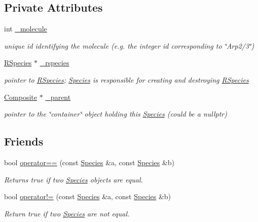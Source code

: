 \subsection*{Private Attributes}
\begin{DoxyCompactItemize}
\item 
int \hyperlink{classchem_1_1Species_afc69264ab4c24ac17b7d1946b1b380f4}{\-\_\-molecule}
\begin{DoxyCompactList}\small\item\em unique id identifying the molecule (e.\-g. the integer id corresponding to \char`\"{}\-Arp2/3\char`\"{}) \end{DoxyCompactList}\item 
\hyperlink{classchem_1_1RSpecies}{R\-Species} $\ast$ \hyperlink{classchem_1_1Species_aa6a2ec40f6f1b08c76a184d11571c570}{\-\_\-rspecies}
\begin{DoxyCompactList}\small\item\em pointer to \hyperlink{classchem_1_1RSpecies}{R\-Species}; \hyperlink{classchem_1_1Species}{Species} is responsible for creating and destroying \hyperlink{classchem_1_1RSpecies}{R\-Species} \end{DoxyCompactList}\item 
\hyperlink{classchem_1_1Composite}{Composite} $\ast$ \hyperlink{classchem_1_1Species_ae0743ec422b63dcb29b4cbfee484902d}{\-\_\-parent}
\begin{DoxyCompactList}\small\item\em pointer to the \char`\"{}container\char`\"{} object holding this \hyperlink{classchem_1_1Species}{Species} (could be a nullptr) \end{DoxyCompactList}\end{DoxyCompactItemize}
\subsection*{Friends}
\begin{DoxyCompactItemize}
\item 
bool \hyperlink{classchem_1_1Species_a22987c5719b74c50465256ea5b9d80bf}{operator==} (const \hyperlink{classchem_1_1Species}{Species} \&a, const \hyperlink{classchem_1_1Species}{Species} \&b)
\begin{DoxyCompactList}\small\item\em Returns true if two \hyperlink{classchem_1_1Species}{Species} objects are equal. \end{DoxyCompactList}\item 
bool \hyperlink{classchem_1_1Species_aff630d716711fbbab3bc7f598230316b}{operator!=} (const \hyperlink{classchem_1_1Species}{Species} \&a, const \hyperlink{classchem_1_1Species}{Species} \&b)
\begin{DoxyCompactList}\small\item\em Return true if two \hyperlink{classchem_1_1Species}{Species} are not equal. \end{DoxyCompactList}\end{DoxyCompactItemize}


